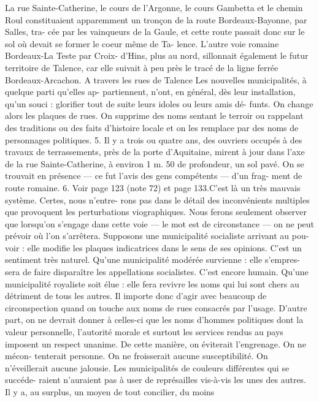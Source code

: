 \documentclass[a4paper,11pt]{book}
\begin{document}
La rue Sainte-Catherine, le cours de l'Argonne, le cours
Gambetta et le chemin Roul constituaient apparemment
un tronçon de la route Bordeaux-Bayonne, par Salles, tra-
cée par les vainqueurs de la Gaule, et cette route passait
donc sur le sol où devait se former le coeur même de Ta-
lence.
L'autre voie romaine Bordeaux-La Teste par Croix-
d'Hins, plus au nord, sillonnait également le futur territoire
de Talence, car elle suivait à peu près le tracé de la ligne
ferrée Bordeaux-Arcachon.
A travers les rues de Talence
Les nouvelles municipalités, à quelque parti qu'elles ap-
partiennent, n'ont, en général, dès leur installation, qu'un
souci : glorifier tout de suite leurs idoles ou leurs amis dé-
funts. On change alors les plaques de rues. On supprime
des noms sentant le terroir ou rappelant des traditions ou
des faits d'histoire locale et on les remplace par des noms
de personnages politiques.
5. Il y a trois ou quatre ans, des ouvriers occupés à des travaux de
terrassements, près de la porte d'Aquitaine, mirent à jour dans l'axe de la
rue Sainte-Catherine, à environ 1 m. 50 de profondeur, un sol pavé. On
se trouvait en présence — ce fut l'avis des gens compétents — d'un frag-
ment de route romaine.
6. Voir page 123 (note 72) et page 133.C'est là un très mauvais système. Certes, nous n'entre-
rons pas dans le détail des inconvénients multiples que
provoquent les perturbations viographiques. Nous ferons
seulement observer que lorsqu'on s'engage dans cette voie
— le mot est de circonstance — on ne peut prévoir où l'on
s'arrêtera.
Supposons une municipalité socialiste arrivant au pou-
voir : elle modifie les plaques indicatrices dans le sens de ses
opinions. C'est un sentiment très naturel.
Qu'une municipalité modérée survienne : elle s'empres-
sera de faire disparaître les appellations socialistes. C'est
encore humain.
Qu'une municipalité royaliste soit élue : elle fera revivre
les noms qui lui sont chers au détriment de tous les autres.
Il importe donc d'agir avec beaucoup de circonspection
quand on touche aux noms de rues consacrés par l'usage.
D'autre part, on ne devrait donner à celles-ci que les noms
d'hommes politiques dont la valeur personnelle, l'autorité
morale et surtout les services rendus au pays imposent un
respect unanime.
De cette manière, on éviterait l'engrenage. On ne mécon-
tenterait personne. On ne froisserait aucune susceptibilité.
On n'éveillerait aucune jalousie.
Les municipalités de couleurs différentes qui se succéde-
raient n'auraient pas à user de représailles vis-à-vis les
unes des autres.
Il y a, au surplus, un moyen de tout concilier, du moins
\end{document}
